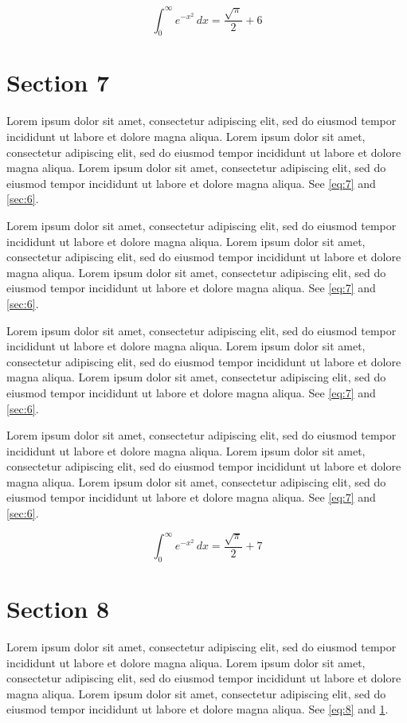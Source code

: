 \documentclass[11pt]{article}
\begin{document}
\begin{equation}\label{eq:6} \int_0^\infty e^{-x^2}\,dx = \frac{\sqrt{\pi}}{2} + 6\end{equation}
\section{Section 7}\label{sec:7}
Lorem ipsum dolor sit amet, consectetur adipiscing elit, sed do eiusmod tempor incididunt ut labore et dolore magna aliqua. Lorem ipsum dolor sit amet, consectetur adipiscing elit, sed do eiusmod tempor incididunt ut labore et dolore magna aliqua. Lorem ipsum dolor sit amet, consectetur adipiscing elit, sed do eiusmod tempor incididunt ut labore et dolore magna aliqua. See \cref{eq:7} and \cref{sec:6}.

Lorem ipsum dolor sit amet, consectetur adipiscing elit, sed do eiusmod tempor incididunt ut labore et dolore magna aliqua. Lorem ipsum dolor sit amet, consectetur adipiscing elit, sed do eiusmod tempor incididunt ut labore et dolore magna aliqua. Lorem ipsum dolor sit amet, consectetur adipiscing elit, sed do eiusmod tempor incididunt ut labore et dolore magna aliqua. See \cref{eq:7} and \cref{sec:6}.

Lorem ipsum dolor sit amet, consectetur adipiscing elit, sed do eiusmod tempor incididunt ut labore et dolore magna aliqua. Lorem ipsum dolor sit amet, consectetur adipiscing elit, sed do eiusmod tempor incididunt ut labore et dolore magna aliqua. Lorem ipsum dolor sit amet, consectetur adipiscing elit, sed do eiusmod tempor incididunt ut labore et dolore magna aliqua. See \cref{eq:7} and \cref{sec:6}.

Lorem ipsum dolor sit amet, consectetur adipiscing elit, sed do eiusmod tempor incididunt ut labore et dolore magna aliqua. Lorem ipsum dolor sit amet, consectetur adipiscing elit, sed do eiusmod tempor incididunt ut labore et dolore magna aliqua. Lorem ipsum dolor sit amet, consectetur adipiscing elit, sed do eiusmod tempor incididunt ut labore et dolore magna aliqua. See \cref{eq:7} and \cref{sec:6}.

\begin{equation}\label{eq:7} \int_0^\infty e^{-x^2}\,dx = \frac{\sqrt{\pi}}{2} + 7\end{equation}
\section{Section 8}\label{sec:8}
Lorem ipsum dolor sit amet, consectetur adipiscing elit, sed do eiusmod tempor incididunt ut labore et dolore magna aliqua. Lorem ipsum dolor sit amet, consectetur adipiscing elit, sed do eiusmod tempor incididunt ut labore et dolore magna aliqua. Lorem ipsum dolor sit amet, consectetur adipiscing elit, sed do eiusmod tempor incididunt ut labore et dolore magna aliqua. See \cref{eq:8} and \cref{sec:7}.
\end{document}
